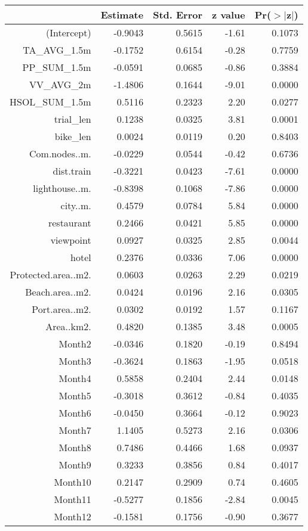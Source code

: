 \begin{table}[ht]
\centering
\begin{tabular}{rrrrr}
  \hline
 & Estimate & Std. Error & z value & Pr($>$$|$z$|$) \\ 
  \hline
(Intercept) & -0.9043 & 0.5615 & -1.61 & 0.1073 \\ 
  TA\_AVG\_1.5m & -0.1752 & 0.6154 & -0.28 & 0.7759 \\ 
  PP\_SUM\_1.5m & -0.0591 & 0.0685 & -0.86 & 0.3884 \\ 
  VV\_AVG\_2m & -1.4806 & 0.1644 & -9.01 & 0.0000 \\ 
  HSOL\_SUM\_1.5m & 0.5116 & 0.2323 & 2.20 & 0.0277 \\ 
  trial\_len & 0.1238 & 0.0325 & 3.81 & 0.0001 \\ 
  bike\_len & 0.0024 & 0.0119 & 0.20 & 0.8403 \\ 
  Com.nodes..m. & -0.0229 & 0.0544 & -0.42 & 0.6736 \\ 
  dist.train & -0.3221 & 0.0423 & -7.61 & 0.0000 \\ 
  lighthouse..m. & -0.8398 & 0.1068 & -7.86 & 0.0000 \\ 
  city..m. & 0.4579 & 0.0784 & 5.84 & 0.0000 \\ 
  restaurant & 0.2466 & 0.0421 & 5.85 & 0.0000 \\ 
  viewpoint & 0.0927 & 0.0325 & 2.85 & 0.0044 \\ 
  hotel & 0.2376 & 0.0336 & 7.06 & 0.0000 \\ 
  Protected.area..m2. & 0.0603 & 0.0263 & 2.29 & 0.0219 \\ 
  Beach.area..m2. & 0.0424 & 0.0196 & 2.16 & 0.0305 \\ 
  Port.area..m2. & 0.0302 & 0.0192 & 1.57 & 0.1167 \\ 
  Area..km2. & 0.4820 & 0.1385 & 3.48 & 0.0005 \\ 
  Month2 & -0.0346 & 0.1820 & -0.19 & 0.8494 \\ 
  Month3 & -0.3624 & 0.1863 & -1.95 & 0.0518 \\ 
  Month4 & 0.5858 & 0.2404 & 2.44 & 0.0148 \\ 
  Month5 & -0.3018 & 0.3612 & -0.84 & 0.4035 \\ 
  Month6 & -0.0450 & 0.3664 & -0.12 & 0.9023 \\ 
  Month7 & 1.1405 & 0.5273 & 2.16 & 0.0306 \\ 
  Month8 & 0.7486 & 0.4466 & 1.68 & 0.0937 \\ 
  Month9 & 0.3233 & 0.3856 & 0.84 & 0.4017 \\ 
  Month10 & 0.2147 & 0.2909 & 0.74 & 0.4605 \\ 
  Month11 & -0.5277 & 0.1856 & -2.84 & 0.0045 \\ 
  Month12 & -0.1581 & 0.1756 & -0.90 & 0.3677 \\ 
   \hline
\end{tabular}
\end{table}
